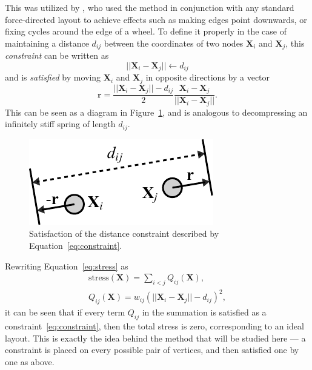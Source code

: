 This was utilized by \citet{Dwyer2009}, who used the method in conjunction with any standard force-directed layout to achieve effects such as making edges point downwards, or fixing cycles around the edge of a wheel. To define it properly in the case of maintaining a distance $d_{ij}$ between the coordinates of two nodes $\mathbf{X}_i$ and $\mathbf{X}_j$, this \emph{constraint} can be written as
\begin{equation}
  ||\mathbf{X}_i - \mathbf{X}_j|| \leftarrow d_{ij}
  \label{eq:constraint}
\end{equation}
and is \emph{satisfied} by moving $\mathbf{X}_i$ and $\mathbf{X}_j$ in opposite directions by a vector
\begin{equation}
  \mathbf{r} = \frac{||\mathbf{X}_i - \mathbf{X}_j||-d_{ij}}{2}\frac{\mathbf{X}_i - \mathbf{X}_j}{||\mathbf{X}_i - \mathbf{X}_j||}.
  \label{eq:satisfaction}
\end{equation}
This can be seen as a diagram in Figure~\ref{fig:satisfaction}, and is analogous to decompressing an infinitely stiff spring of length $d_{ij}$.

\begin{figure}
  \centering
  \includegraphics[width=.5\textwidth]{stress/satisfaction.pdf}
  \caption[Illustration of the distance constraint in Equation~\ref{eq:constraint}]{Satisfaction of the distance constraint described by Equation~\eqref{eq:constraint}.}
  \label{fig:satisfaction}
\end{figure}

Rewriting Equation~\eqref{eq:stress} as
\begin{gather}
\label{stress-terms}
\mathrm{stress}(\mathbf{X}) = \sum_{i<j} Q_{ij}(\mathbf{X}),\\
\label{qij}
Q_{ij}(\mathbf{X}) = w_{ij}(||\mathbf{X}_i - \mathbf{X}_j|| - d_{ij})^2,
\end{gather}
it can be seen that if every term $Q_{ij}$ in the summation is satisfied as a constraint~\eqref{eq:constraint}, then the total stress is zero, corresponding to an ideal layout. 
This is exactly the idea behind the method that will be studied here --- a constraint is placed on every possible pair of vertices, and then satisfied one by one as above.

